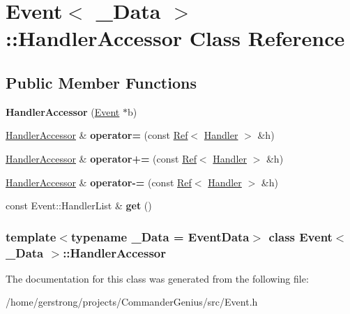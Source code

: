 \hypertarget{class_event_1_1_handler_accessor}{
\section{Event$<$ \_\-Data $>$::HandlerAccessor Class Reference}
\label{class_event_1_1_handler_accessor}
}
\subsection*{Public Member Functions}
\begin{DoxyCompactItemize}
\item 
\hypertarget{class_event_1_1_handler_accessor_a8d479a50104533e765b334dd4d555ef9}{
{\bfseries HandlerAccessor} (\hyperlink{class_event}{Event} $\ast$b)}
\label{class_event_1_1_handler_accessor_a8d479a50104533e765b334dd4d555ef9}

\item 
\hypertarget{class_event_1_1_handler_accessor_a73877c20a2877b06cd02458381d8a0f5}{
\hyperlink{class_event_1_1_handler_accessor}{HandlerAccessor} \& {\bfseries operator=} (const \hyperlink{class_ref}{Ref}$<$ \hyperlink{class_event_1_1_handler}{Handler} $>$ \&h)}
\label{class_event_1_1_handler_accessor_a73877c20a2877b06cd02458381d8a0f5}

\item 
\hypertarget{class_event_1_1_handler_accessor_a9c30ed3d45a891bb4e663629cd4d81b3}{
\hyperlink{class_event_1_1_handler_accessor}{HandlerAccessor} \& {\bfseries operator+=} (const \hyperlink{class_ref}{Ref}$<$ \hyperlink{class_event_1_1_handler}{Handler} $>$ \&h)}
\label{class_event_1_1_handler_accessor_a9c30ed3d45a891bb4e663629cd4d81b3}

\item 
\hypertarget{class_event_1_1_handler_accessor_afc062b6da6426d333b9b5d4cf7dfa9ab}{
\hyperlink{class_event_1_1_handler_accessor}{HandlerAccessor} \& {\bfseries operator-\/=} (const \hyperlink{class_ref}{Ref}$<$ \hyperlink{class_event_1_1_handler}{Handler} $>$ \&h)}
\label{class_event_1_1_handler_accessor_afc062b6da6426d333b9b5d4cf7dfa9ab}

\item 
\hypertarget{class_event_1_1_handler_accessor_a5c4e77ad2eae018e66f5513cf2c4b463}{
const Event::HandlerList \& {\bfseries get} ()}
\label{class_event_1_1_handler_accessor_a5c4e77ad2eae018e66f5513cf2c4b463}

\end{DoxyCompactItemize}
\subsubsection*{template$<$typename \_\-Data = EventData$>$ class Event$<$ \_\-Data $>$::HandlerAccessor}



The documentation for this class was generated from the following file:\begin{DoxyCompactItemize}
\item 
/home/gerstrong/projects/CommanderGenius/src/Event.h\end{DoxyCompactItemize}
